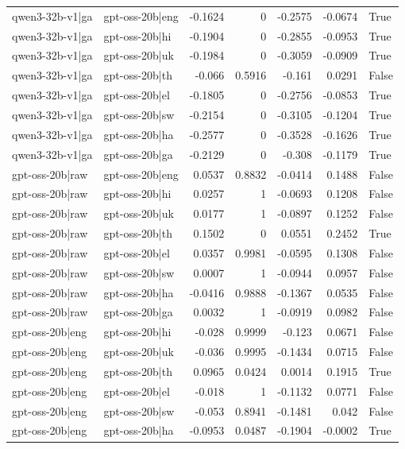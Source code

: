 \begin{table}
\begin{tabular}{l l r r r r l}
qwen3-32b-v1|ga & gpt-oss-20b|eng & -0.1624 & 0 & -0.2575 & -0.0674 & True \\
qwen3-32b-v1|ga & gpt-oss-20b|hi & -0.1904 & 0 & -0.2855 & -0.0953 & True \\
qwen3-32b-v1|ga & gpt-oss-20b|uk & -0.1984 & 0 & -0.3059 & -0.0909 & True \\
qwen3-32b-v1|ga & gpt-oss-20b|th & -0.066 & 0.5916 & -0.161 & 0.0291 & False \\
qwen3-32b-v1|ga & gpt-oss-20b|el & -0.1805 & 0 & -0.2756 & -0.0853 & True \\
qwen3-32b-v1|ga & gpt-oss-20b|sw & -0.2154 & 0 & -0.3105 & -0.1204 & True \\
qwen3-32b-v1|ga & gpt-oss-20b|ha & -0.2577 & 0 & -0.3528 & -0.1626 & True \\
qwen3-32b-v1|ga & gpt-oss-20b|ga & -0.2129 & 0 & -0.308 & -0.1179 & True \\
gpt-oss-20b|raw & gpt-oss-20b|eng & 0.0537 & 0.8832 & -0.0414 & 0.1488 & False \\
gpt-oss-20b|raw & gpt-oss-20b|hi & 0.0257 & 1 & -0.0693 & 0.1208 & False \\
gpt-oss-20b|raw & gpt-oss-20b|uk & 0.0177 & 1 & -0.0897 & 0.1252 & False \\
gpt-oss-20b|raw & gpt-oss-20b|th & 0.1502 & 0 & 0.0551 & 0.2452 & True \\
gpt-oss-20b|raw & gpt-oss-20b|el & 0.0357 & 0.9981 & -0.0595 & 0.1308 & False \\
gpt-oss-20b|raw & gpt-oss-20b|sw & 0.0007 & 1 & -0.0944 & 0.0957 & False \\
gpt-oss-20b|raw & gpt-oss-20b|ha & -0.0416 & 0.9888 & -0.1367 & 0.0535 & False \\
gpt-oss-20b|raw & gpt-oss-20b|ga & 0.0032 & 1 & -0.0919 & 0.0982 & False \\
gpt-oss-20b|eng & gpt-oss-20b|hi & -0.028 & 0.9999 & -0.123 & 0.0671 & False \\
gpt-oss-20b|eng & gpt-oss-20b|uk & -0.036 & 0.9995 & -0.1434 & 0.0715 & False \\
gpt-oss-20b|eng & gpt-oss-20b|th & 0.0965 & 0.0424 & 0.0014 & 0.1915 & True \\
gpt-oss-20b|eng & gpt-oss-20b|el & -0.018 & 1 & -0.1132 & 0.0771 & False \\
gpt-oss-20b|eng & gpt-oss-20b|sw & -0.053 & 0.8941 & -0.1481 & 0.042 & False \\
gpt-oss-20b|eng & gpt-oss-20b|ha & -0.0953 & 0.0487 & -0.1904 & -0.0002 & True \\

\end{tabular}
\end{table}
